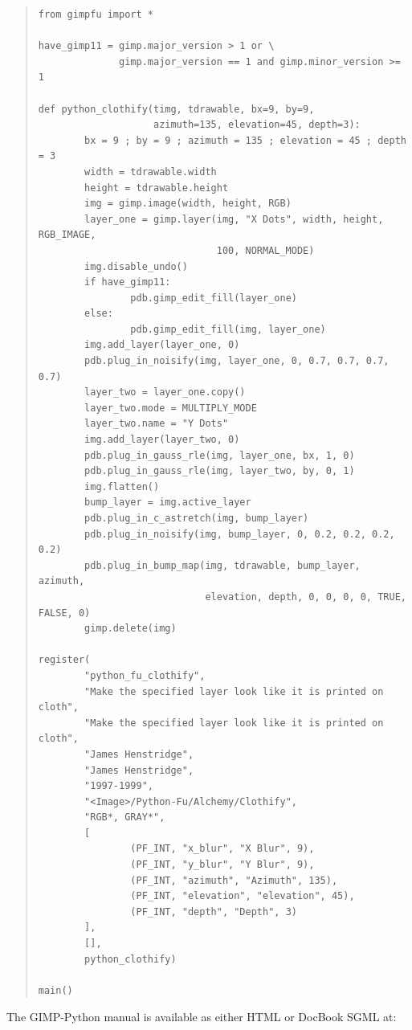 \documentclass[twoside,11pt]{article}
\begin{document}
\small
\begin{quote}
\begin{verbatim}
from gimpfu import *

have_gimp11 = gimp.major_version > 1 or \
              gimp.major_version == 1 and gimp.minor_version >= 1

def python_clothify(timg, tdrawable, bx=9, by=9,
                    azimuth=135, elevation=45, depth=3):
        bx = 9 ; by = 9 ; azimuth = 135 ; elevation = 45 ; depth = 3
        width = tdrawable.width
        height = tdrawable.height
        img = gimp.image(width, height, RGB)
        layer_one = gimp.layer(img, "X Dots", width, height, RGB_IMAGE,
                               100, NORMAL_MODE)
        img.disable_undo()
        if have_gimp11:
                pdb.gimp_edit_fill(layer_one)
        else:
                pdb.gimp_edit_fill(img, layer_one)
        img.add_layer(layer_one, 0)
        pdb.plug_in_noisify(img, layer_one, 0, 0.7, 0.7, 0.7, 0.7)
        layer_two = layer_one.copy()
        layer_two.mode = MULTIPLY_MODE
        layer_two.name = "Y Dots"
        img.add_layer(layer_two, 0)
        pdb.plug_in_gauss_rle(img, layer_one, bx, 1, 0)
        pdb.plug_in_gauss_rle(img, layer_two, by, 0, 1)
        img.flatten()
        bump_layer = img.active_layer
        pdb.plug_in_c_astretch(img, bump_layer)
        pdb.plug_in_noisify(img, bump_layer, 0, 0.2, 0.2, 0.2, 0.2)
        pdb.plug_in_bump_map(img, tdrawable, bump_layer, azimuth,
                             elevation, depth, 0, 0, 0, 0, TRUE, FALSE, 0)
        gimp.delete(img)

register(
        "python_fu_clothify",
        "Make the specified layer look like it is printed on cloth",
        "Make the specified layer look like it is printed on cloth",
        "James Henstridge",
        "James Henstridge",
        "1997-1999",
        "<Image>/Python-Fu/Alchemy/Clothify",
        "RGB*, GRAY*",
        [
                (PF_INT, "x_blur", "X Blur", 9),
                (PF_INT, "y_blur", "Y Blur", 9),
                (PF_INT, "azimuth", "Azimuth", 135),
                (PF_INT, "elevation", "elevation", 45),
                (PF_INT, "depth", "Depth", 3)
        ],
        [],
        python_clothify)

main()
\end{verbatim}
\end{quote}
\normalsize

The GIMP-Python manual is available as either HTML or DocBook SGML at: 
\end{document}

